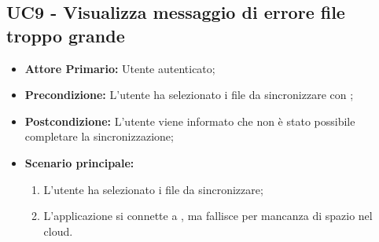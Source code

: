 \subsection{UC9 - Visualizza messaggio di errore file troppo grande}
\label{UC9}
\begin{itemize}
\item \textbf{Attore Primario:} Utente autenticato;
\item \textbf{Precondizione:} L'utente ha selezionato i file da sincronizzare con ;
\item \textbf{Postcondizione:} L'utente viene informato che non è stato possibile completare la sincronizzazione;
\item \textbf{Scenario principale:}
    \begin{enumerate}
    \item L'utente ha selezionato i file da sincronizzare;
    \item L'applicazione si connette a , ma fallisce per mancanza di spazio nel cloud.
    \end{enumerate}
\end{itemize}